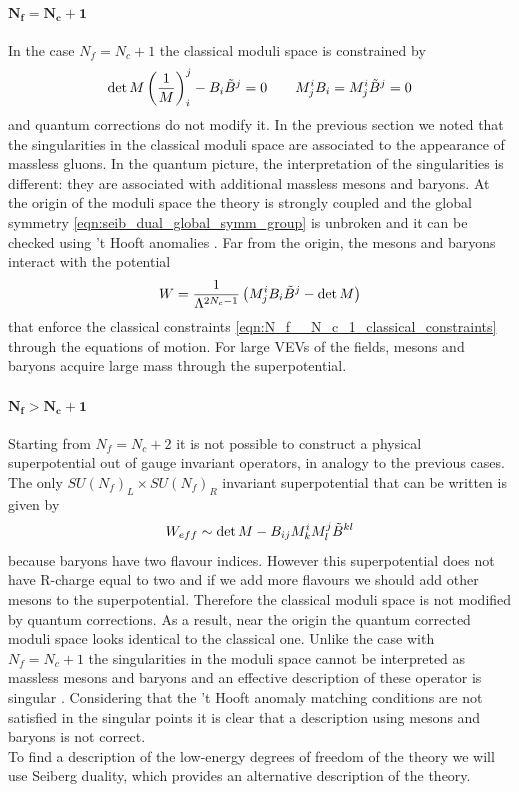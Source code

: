 \paragraph{$\mathbf{N_f = N_c +1}$}
In the case $N_f = N_c +1 $ the classical moduli space is constrained by
\begin{equation}
 \mathrm{det } \,{M} \left( \frac{1}{M}\right)^j_i - B_i \tilde{B}^j = 0 \qquad
 M^i_j B_i = M^i_j \tilde{B}^j = 0 
 \label{eqn:N_f__N_c_1_classical_constraints}
\end{equation}
and quantum corrections do not modify it.
In the previous section we noted that the singularities in the classical moduli space are associated to the appearance of massless gluons.
In the quantum picture, the interpretation of the singularities is different: they are associated with additional massless mesons and baryons.
At the origin of the moduli space the theory is strongly coupled and the global symmetry \eqref{eqn:seib_dual_global_symm_group} is unbroken and it can be checked using 't Hooft anomalies \cite{Seiberg:1994bz}.
Far from the origin, the mesons and baryons interact with the potential 
\begin{equation}
W = \frac{1}{\Lambda^{2 N_c -1}} \left( M^i_j B_i \tilde{B}^j - \mathrm{det } \,{M} \right)
\end{equation}
that enforce the classical constraints \eqref{eqn:N_f__N_c_1_classical_constraints} through the equations of motion.
For large VEVs of the fields, mesons and baryons acquire large mass through the superpotential.
\paragraph{$\mathbf{ N_f > N_c +1 }$}
Starting from $N_f = N_c +2$ it is not possible to construct a physical superpotential out of gauge invariant operators, in analogy to the previous cases.
The only $SU(N_f)_L \times SU(N_f)_R$ invariant superpotential that can be written is given by
\begin{equation}
 W_{eff} \sim \mathrm{det } \,{M} - B_{ij} M^i_k M^j_l \tilde{B}^{kl} 
 \end{equation} 
because baryons have two flavour indices.
However this superpotential does not have R-charge equal to two and if we add more flavours we should add other mesons to the superpotential. Therefore the classical moduli space is not modified by quantum corrections.
As a result, near the origin the quantum corrected moduli space looks identical to the classical one.
Unlike the case with $N_f = N_c +1$ the singularities in the moduli space cannot be interpreted as massless mesons and baryons and an effective description of these operator is singular \cite{Seiberg:1994bz}.
Considering that the 't Hooft anomaly matching conditions are not satisfied in the singular points it is clear that a description using mesons and baryons is not correct.
\\
To find a description of the low-energy degrees of freedom of the theory we will use Seiberg duality, which provides an alternative description of the theory.


